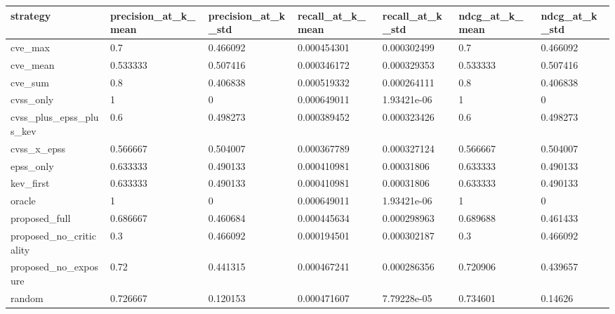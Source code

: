 \begin{tabular}{l l l l l l l}
\hline
strategy & precision\_at\_k\_mean & precision\_at\_k\_std & recall\_at\_k\_mean & recall\_at\_k\_std & ndcg\_at\_k\_mean & ndcg\_at\_k\_std \\
\hline
cve\_max & 0.7 & 0.466092 & 0.000454301 & 0.000302499 & 0.7 & 0.466092 \\
cve\_mean & 0.533333 & 0.507416 & 0.000346172 & 0.000329353 & 0.533333 & 0.507416 \\
cve\_sum & 0.8 & 0.406838 & 0.000519332 & 0.000264111 & 0.8 & 0.406838 \\
cvss\_only & 1 & 0 & 0.000649011 & 1.93421e-06 & 1 & 0 \\
cvss\_plus\_epss\_plus\_kev & 0.6 & 0.498273 & 0.000389452 & 0.000323426 & 0.6 & 0.498273 \\
cvss\_x\_epss & 0.566667 & 0.504007 & 0.000367789 & 0.000327124 & 0.566667 & 0.504007 \\
epss\_only & 0.633333 & 0.490133 & 0.000410981 & 0.00031806 & 0.633333 & 0.490133 \\
kev\_first & 0.633333 & 0.490133 & 0.000410981 & 0.00031806 & 0.633333 & 0.490133 \\
oracle & 1 & 0 & 0.000649011 & 1.93421e-06 & 1 & 0 \\
proposed\_full & 0.686667 & 0.460684 & 0.000445634 & 0.000298963 & 0.689688 & 0.461433 \\
proposed\_no\_criticality & 0.3 & 0.466092 & 0.000194501 & 0.000302187 & 0.3 & 0.466092 \\
proposed\_no\_exposure & 0.72 & 0.441315 & 0.000467241 & 0.000286356 & 0.720906 & 0.439657 \\
random & 0.726667 & 0.120153 & 0.000471607 & 7.79228e-05 & 0.734601 & 0.14626 \\
\hline
\end{tabular}
